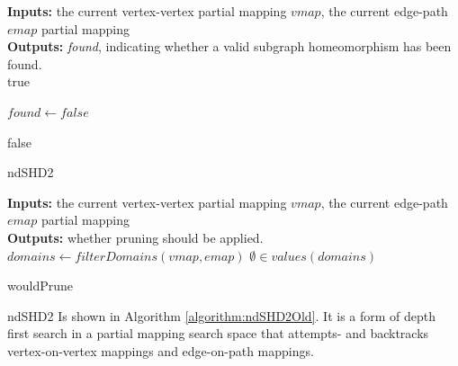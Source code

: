 \begin{algorithm}
\SetAlgoLined
\LinesNumbered
\textbf{Inputs: } the current vertex-vertex partial mapping $\mathit{vmap}$, the current edge-path $\mathit{emap}$ partial mapping\\
\textbf{Outputs: } \textit{found}, indicating whether a valid subgraph homeomorphism has been found.\\

 {
	\Return true\;
}

$\mathit{found} \longleftarrow \mathit{false}$

 \Return false\;
 \caption{ndSHD2}
 \label{algorithm:ndSHD2Old}
\end{algorithm}


\begin{algorithm}
\SetAlgoLined
\LinesNumbered
\textbf{Inputs: } the current vertex-vertex partial mapping $\mathit{vmap}$, the current edge-path $\mathit{emap}$ partial mapping\\
\textbf{Outputs: } whether pruning should be applied.\\
$\mathit{domains} \longleftarrow \mathit{filterDomains}(\mathit{vmap}, \mathit{emap})$\;
	\Return $\emptyset \in \mathit{values}(\mathit{domains})$\;
 \caption{wouldPrune}
 \label{algorithm:wouldPrune}
\end{algorithm}



ndSHD2 Is shown in Algorithm \ref{algorithm:ndSHD2Old}. It is a form of depth first search in a partial mapping search space that attempts- and backtracks vertex-on-vertex mappings and edge-on-path mappings.

